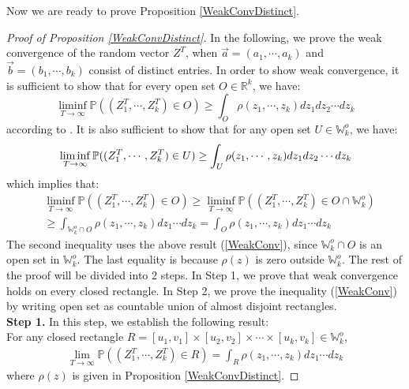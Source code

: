 Now we are ready to prove Proposition \ref{WeakConvDistinct}.
\begin{proof}[Proof of Proposition \ref{WeakConvDistinct}]
In the following, we prove the weak convergence of the random vector $Z^{T}$, when $\vec{a}=(a_{1},\cdots,a_{k})$ and $\vec{b}=(b_{1},\cdots,b_{k})$ consist of distinct entries. 
In order to show weak convergence, it is sufficient to show that for every open set $O\in\mathbb{R}^{k}$, we have: 
$$\liminf_{T\rightarrow\infty}\mathbb{P}((Z_{1}^{T},\cdots,Z_{k}^{T})\in O)\geq\int_{O}\rho(z_{1},\cdots,z_{k})dz_{1}dz_{2}\cdots dz_{k}$$
according to \cite[Theorem 3.2.11]{Durrett}. It is also sufficient to show that for any open set $U\in\mathbb{W}_{k}^{o}$, we have:
\begin{align}{\label{WeakConv}}
	\liminf_{T\rightarrow\infty}\mathbb{P}((Z_{1}^{T},\cdots,Z_{k}^{T})\in U)\geq\int_{U}\rho(z_{1},\cdots,z_{k})dz_{1}dz_{2}\cdots dz_{k}
\end{align}
which implies that:
\begin{align*}
	&\liminf_{T\rightarrow\infty}\mathbb{P}((Z_{1}^{T},\cdots,Z_{k}^{T})\in O)\geq\liminf_{T\rightarrow\infty}\mathbb{P}((Z_{1}^{T},\cdots,Z_{k}^{T})\in O\cap\mathbb{W}_{k}^{o})\\
	&\geq \int_{\mathbb{W}_{k}^{o}\cap O}\rho(z_{1},\cdots,z_{k})dz_{1}\cdots dz_{k}= \int_{O}\rho(z_{1},\cdots,z_{k})dz_{1}\cdots dz_{k}
\end{align*}
The second inequality uses the above result (\ref{WeakConv}), since $\mathbb{W}_{k}^{o}\cap O$ is an open set in $\mathbb{W}_{k}^{o}$. The last equality is because $\rho(z)$ is zero outside $\mathbb{W}_{k}^{o}$. The rest of the proof will be divided into $2$ steps. In Step 1, we prove that weak convergence holds on every closed rectangle. In Step 2, we prove the inequality (\ref{WeakConv}) by writing open set as countable union of almost disjoint rectangles. \\
\noindent \textbf{Step 1. }In this step, we establish the following result:\\
For any closed rectangle $R=[u_{1},v_{1}]\times [u_{2},v_{2}]\times\cdots\times[u_{k},v_{k}]\in\mathbb{W}_{k}^{o}$, 
\begin{align}
	\lim_{T\rightarrow\infty}\mathbb{P}((Z_{1}^{T},\cdots,Z_{k}^{T})\in R)=\int_{R}\rho(z_{1},\cdots,z_{k})dz_{1}\cdots dz_{k}
\end{align}
where $\rho(z)$ is given in Proposition \ref{WeakConvDistinct}.


\end{proof}
